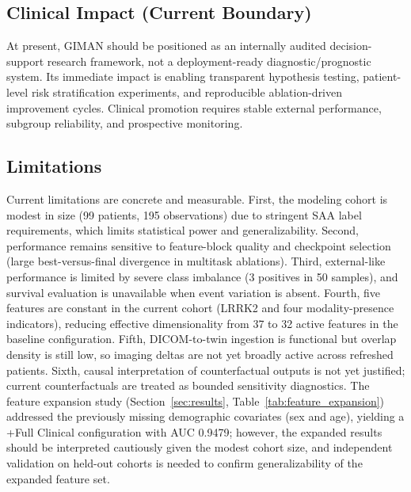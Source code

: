 \documentclass[journal,twoside,web]{ieeecolor}
\begin{document}
\subsection{Clinical Impact (Current Boundary)}
At present, GIMAN should be positioned as an internally audited decision-support research framework, not a deployment-ready diagnostic/prognostic system. Its immediate impact is enabling transparent hypothesis testing, patient-level risk stratification experiments, and reproducible ablation-driven improvement cycles. Clinical promotion requires stable external performance, subgroup reliability, and prospective monitoring.

\subsection{Limitations}
Current limitations are concrete and measurable. First, the modeling cohort is modest in size (99 patients, 195 observations) due to stringent SAA label requirements, which limits statistical power and generalizability. Second, performance remains sensitive to feature-block quality and checkpoint selection (large best-versus-final divergence in multitask ablations). Third, external-like performance is limited by severe class imbalance (3 positives in 50 samples), and survival evaluation is unavailable when event variation is absent. Fourth, five features are constant in the current cohort (LRRK2 and four modality-presence indicators), reducing effective dimensionality from 37 to 32 active features in the baseline configuration. Fifth, DICOM-to-twin ingestion is functional but overlap density is still low, so imaging deltas are not yet broadly active across refreshed patients. Sixth, causal interpretation of counterfactual outputs is not yet justified; current counterfactuals are treated as bounded sensitivity diagnostics. The feature expansion study (Section~\ref{sec:results}, Table~\ref{tab:feature_expansion}) addressed the previously missing demographic covariates (sex and age), yielding a +Full Clinical configuration with AUC 0.9479; however, the expanded results should be interpreted cautiously given the modest cohort size, and independent validation on held-out cohorts is needed to confirm generalizability of the expanded feature set.
\end{document}
